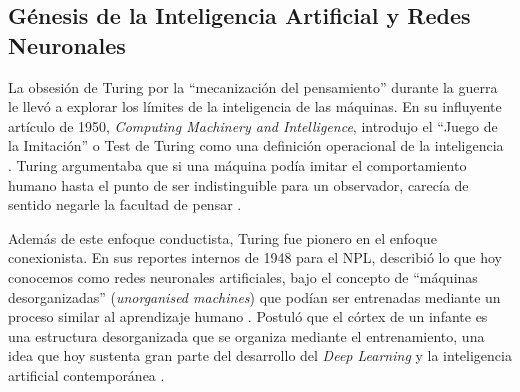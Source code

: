 \subsection{Génesis de la Inteligencia Artificial y Redes Neuronales}

La obsesión de Turing por la ``mecanización del pensamiento'' durante la guerra le llevó a explorar los límites de la inteligencia de las máquinas. En su influyente artículo de 1950, \textit{Computing Machinery and Intelligence}, introdujo el ``Juego de la Imitación'' o Test de Turing como una definición operacional de la inteligencia \cite{lahoz2012turing, strathern1997turing}. Turing argumentaba que si una máquina podía imitar el comportamiento humano hasta el punto de ser indistinguible para un observador, carecía de sentido negarle la facultad de pensar \cite{hodges2014turing}.

Además de este enfoque conductista, Turing fue pionero en el enfoque conexionista. En sus reportes internos de 1948 para el NPL, describió lo que hoy conocemos como redes neuronales artificiales, bajo el concepto de ``máquinas desorganizadas'' (\textit{unorganised machines}) que podían ser entrenadas mediante un proceso similar al aprendizaje humano \cite{hodges2014turing, lahoz2012turing}. Postuló que el córtex de un infante es una estructura desorganizada que se organiza mediante el entrenamiento, una idea que hoy sustenta gran parte del desarrollo del \textit{Deep Learning} y la inteligencia artificial contemporánea \cite{hodges2014turing}.